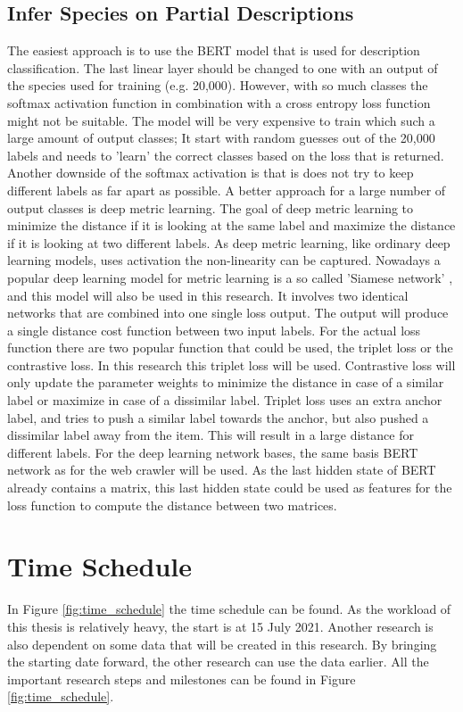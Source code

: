 \documentclass{article}
\begin{document}
\subsection{Infer Species on Partial Descriptions}
The easiest approach is to use the BERT model that is used for description classification.
The last linear layer should be changed to one with an output of the species used for training (e.g. 20,000).
However, with so much classes the softmax activation function in combination with a cross entropy loss function might not be suitable.
The model will be very expensive to train which such a large amount of output classes; It start with random guesses out of the 20,000 labels and needs to 'learn' the correct classes based on the loss that is returned.
Another downside of the softmax activation is that is does not try to keep different labels as far apart as possible.
A better approach for a large number of output classes is deep metric learning.
The goal of deep metric learning to minimize the distance if it is looking at the same label and maximize the distance if it is looking at two different labels.
As deep metric learning, like ordinary deep learning models, uses activation the non-linearity can be captured.
Nowadays a popular deep learning model for metric learning is a so called 'Siamese network' \cite{kaya_deep_2019}, and this model will also be used in this research.
It involves two identical networks that are combined into one single loss output.
The output will produce a single distance cost function between two input labels.
For the actual loss function there are two popular function that could be used, the triplet loss or the contrastive loss.
In this research this triplet loss \cite{schroff_facenet_2015} will be used.
Contrastive loss will only update the parameter weights to minimize the distance in case of a similar label or maximize in case of a dissimilar label.
Triplet loss uses an extra anchor label, and tries to push a similar label towards the anchor, but also pushed a dissimilar label away from the item.
This will result in a large distance for different labels.
For the deep learning network bases, the same basis BERT network as for the web crawler will be used.
As the last hidden state of BERT already contains a matrix, this last hidden state could be used as features for the loss function to compute the distance between two matrices.

\section{Time Schedule}
In Figure \ref{fig:time_schedule} the time schedule can be found. 
As the workload of this thesis is relatively heavy, the start is at 15 July 2021.
Another research is also dependent on some data that will be created in this research.
By bringing the starting date forward, the other research can use the data earlier.
All the important research steps and milestones can be found in Figure \ref{fig:time_schedule}.
\end{document}
